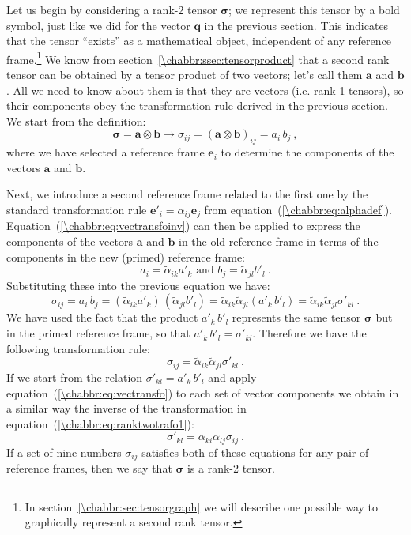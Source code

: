 Let us begin by considering a rank-2 tensor $\bm{\sigma}$; we represent this tensor by a bold symbol, just like we did for the vector $\mathbf{q}$ in the previous section. This indicates that the tensor ``exists'' as a mathematical object, independent of any reference frame.\footnote{In section~\ref{\chabbr:sec:tensorgraph} we will describe one possible way to graphically represent a second rank tensor.}  We know from section~\ref{\chabbr:ssec:tensorproduct} that a second rank tensor can be obtained by a tensor product of two vectors; let's call them $\mathbf{a}$ and $\mathbf{b}$.  All we need to know about them is that they are vectors (i.e. rank-1 tensors), so their components obey the transformation rule derived in the previous section.  We start from the definition:
\begin{equation}
	\bm{\sigma} = \mathbf{a}\otimes\mathbf{b}\rightarrow \sigma_{ij} = (\mathbf{a}\otimes\mathbf{b})_{ij} = a_i\,b_j\ ,
\end{equation}
where we have selected a reference frame $\mathbf{e}_i$ to determine the components of the vectors $\mathbf{a}$ and $\mathbf{b}$.  

Next, we introduce a second reference frame related to the first one by the standard transformation rule $\mathbf{e}'_i = \alpha_{ij}\mathbf{e}_j$ from equation~(\ref{\chabbr:eq:alphadef}).  Equation~(\ref{\chabbr:eq:vectransfoinv}) can then be applied to express the components of the vectors $\mathbf{a}$ and $\mathbf{b}$ in the old reference frame in terms of the components in the new (primed) reference frame:
\[
	a_i = \tilde{\alpha}_{ik}a'_k\text{ and }b_j=\tilde{\alpha}_{jl}b'_l\ .
\]
Substituting these into the previous equation we have:
\[
	\sigma_{ij} = a_i\,b_j = (\tilde{\alpha}_{ik}a'_k)\,(\tilde{\alpha}_{jl}b'_l) = \tilde{\alpha}_{ik}\tilde{\alpha}_{jl} (a'_k\,b'_l) = \tilde{\alpha}_{ik}\tilde{\alpha}_{jl} \sigma'_{kl}\ .
\]
We have used the fact that the product $a'_k\,b'_l$ represents the same tensor $\bm{\sigma}$ but in the primed reference frame, so that $a'_k\,b'_l=\sigma'_{kl}$.  Therefore we have the following transformation rule:
\begin{equation}
	\sigma_{ij} = \tilde{\alpha}_{ik}\tilde{\alpha}_{jl} \sigma'_{kl}\ .\label{\chabbr:eq:ranktwotrafo1}
\end{equation}
If we start from the relation $\sigma'_{kl}=a'_k\,b'_l$ and apply equation~(\ref{\chabbr:eq:vectransfo}) to each set of vector components we obtain in a similar way the inverse of the transformation in equation~(\ref{\chabbr:eq:ranktwotrafo1}):
\begin{equation}
	\sigma'_{kl} = \alpha_{ki}\alpha_{lj} \sigma_{ij}\ .\label{\chabbr:eq:ranktwotrafo2}
\end{equation}
If a set of nine numbers $\sigma_{ij}$ satisfies both of these equations for any pair of reference frames, then we say that $\bm{\sigma}$ is a rank-2 tensor.


